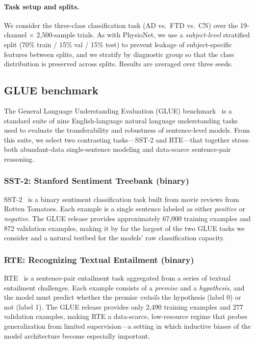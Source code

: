 \paragraph{Task setup and splits.}
We consider the three-class classification task (AD vs.\ FTD vs.\ CN) over the 19-channel $\times$ 2{,}500-sample trials.
As with PhysioNet, we use a \emph{subject-level} stratified split (70\% train / 15\% val / 15\% test) to prevent leakage of subject-specific features between splits, and we stratify by diagnostic group so that the class distribution is preserved across splits.
Results are averaged over three seeds.

\subsection{GLUE benchmark}
\label{sec:glue}

The General Language Understanding Evaluation (GLUE) benchmark~\cite{wang2018glue} is a standard suite of nine English-language natural language understanding tasks used to evaluate the transferability and robustness of sentence-level models.
From this suite, we select two contrasting tasks---SST-2 and RTE---that together stress both abundant-data single-sentence modeling and data-scarce sentence-pair reasoning.

\subsubsection{SST-2: Stanford Sentiment Treebank (binary)}
\label{sec:sst2}

SST-2~\cite{socher2013sst} is a binary sentiment classification task built from movie reviews from Rotten Tomatoes.
Each example is a single sentence labeled as either \emph{positive} or \emph{negative}.
The GLUE release provides approximately 67{,}000 training examples and 872 validation examples, making it by far the largest of the two GLUE tasks we consider and a natural testbed for the models' raw classification capacity.

\subsubsection{RTE: Recognizing Textual Entailment (binary)}
\label{sec:rte}

RTE~\cite{dagan2005pascal,bentivogli2009fifth} is a sentence-pair entailment task aggregated from a series of textual entailment challenges.
Each example consists of a \emph{premise} and a \emph{hypothesis}, and the model must predict whether the premise \emph{entails} the hypothesis (label 0) or not (label 1).
The GLUE release provides only 2{,}490 training examples and 277 validation examples, making RTE a data-scarce, low-resource regime that probes generalization from limited supervision---a setting in which inductive biases of the model architecture become especially important.

